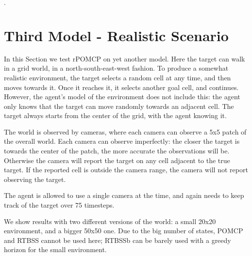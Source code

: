 .


\clearpage
\section{Third Model - Realistic Scenario}

In this Section we test rPOMCP on yet another model. Here the target can walk in a grid world, in a
north-south-east-west fashion. To produce a somewhat realistic environment, the target selects a
random cell at any time, and then moves towards it. Once it reaches it, it selects another goal
cell, and continues. However, the agent's model of the environment does not include this: the agent
only knows that the target can move randomly towards an adjacent cell. The target always starts from
the center of the grid, with the agent knowing it.

The world is observed by cameras, where each camera can observe a 5x5 patch of the overall world.
Each camera can observe imperfectly: the closer the target is towards the center of the patch, the
more accurate the observations will be. Otherwise the camera will report the target on any cell
adjacent to the true target. If the reported cell is outside the camera range, the camera will not
report observing the target.

The agent is allowed to use a single camera at the time, and again needs to keep track of the target
over 75 timesteps.

We show results with two different versions of the world: a small 20x20 environment, and a bigger
50x50 one. Due to the big number of states, POMCP and RTBSS cannot be used here; RTBSSb can be
barely used with a greedy horizon for the small environment.

